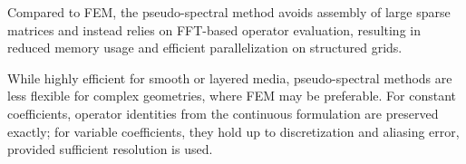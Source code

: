 \documentclass[pdflatex,sn-mathphys-num]{sn-jnl}
\theoremstyle{thmstyleone}%
\theoremstyle{thmstyletwo}%
\theoremstyle{thmstylethree}%
\theoremstyle{definition}
\begin{document}
	Compared to FEM, the pseudo-spectral method avoids assembly of large sparse matrices and instead relies on FFT-based operator evaluation, resulting in reduced memory usage and efficient parallelization on structured grids.
	
	While highly efficient for smooth or layered media, pseudo-spectral methods are less flexible for complex geometries, where FEM may be preferable. For constant coefficients, operator identities from the continuous formulation are preserved exactly; for variable coefficients, they hold up to discretization and aliasing error, provided sufficient resolution is used.
	


	
	
	
	
	
	
	
	
	
	
	
	
	
	
	
	
	
	
	
	
	
	
	
	
	
	
	
	
	
	
	
	
	
	
	
	
	
	
	
	
	
	
	
	
	
	
	
	
	
	
	
	
	
	
	
	
	
	
	
	
	
	
	
	
	
	
	
	
		
	
	
	
	
	
	
\end{document}
